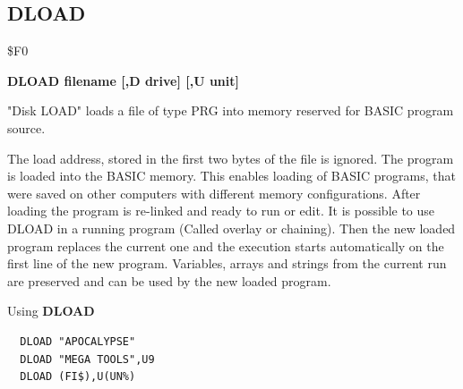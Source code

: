 \subsection{DLOAD}
\begin{description}[leftmargin=2cm,style=nextline]
\item [Token:] \$F0
\item [Format:] {\bf DLOAD filename [,D drive] [,U unit] }
\item [Usage:]
   "Disk LOAD" loads a file of type
   PRG into memory reserved for BASIC program source.

   \filenamedefinition

   \drivedefinition

   \unitdefinition

\item [Remarks:]
   The load address, stored in the first two bytes
   of the file is ignored. The program is loaded into
   the BASIC memory. This enables loading of BASIC programs,
   that were saved on other computers with different memory
   configurations. After loading the program is re-linked
   and ready to run or edit.
   It is possible to use DLOAD in a running program
   (Called overlay or chaining).
   Then the new loaded program replaces the current one
   and the execution starts automatically on the first line of the
   new program. Variables, arrays and strings from the current
   run are preserved and can be used by the new loaded program.

\item [Example:] Using {\bf DLOAD}
\begin{tcolorbox}[colback=black,coltext=white]
\verbatimfont{\codefont}
\begin{verbatim}
  DLOAD "APOCALYPSE"
  DLOAD "MEGA TOOLS",U9
  DLOAD (FI$),U(UN%)
\end{verbatim}
\end{tcolorbox}
\end{description}


\newpage
